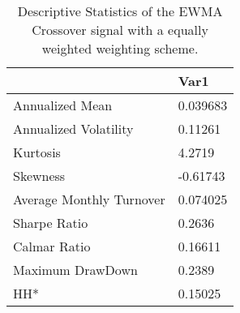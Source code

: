 \begin{table}[H]
\centering
\begin{tabular}{ll}
\hline& Var1 \\ 
\hline 
Annualized Mean & 0.039683 \\ 
Annualized Volatility & 0.11261 \\ 
Kurtosis & 4.2719 \\ 
Skewness & -0.61743 \\ 
Average Monthly Turnover & 0.074025 \\ 
Sharpe Ratio & 0.2636 \\ 
Calmar Ratio & 0.16611 \\ 
Maximum DrawDown & 0.2389 \\ 
HH* & 0.15025 \\ 
\hline
\end{tabular}
\caption{Descriptive Statistics of the EWMA Crossover signal with a equally weighted weighting scheme.}
\label{MBBSEWOQ}
\end{table}